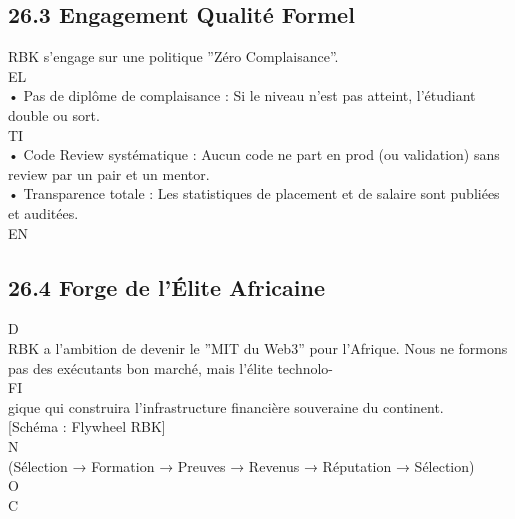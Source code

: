 \documentclass[12pt,landscape,a4paper]{article}
\begin{document}
\subsection{26.3 Engagement Qualité Formel}
RBK s’engage sur une politique ”Zéro Complaisance”.\\
\vspace{0.5em}
\vspace{0.5em}
\vspace{0.5em}
\vspace{0.5em}
EL\\
• Pas de diplôme de complaisance : Si le niveau n’est pas atteint, l’étudiant double ou sort.\\
\vspace{0.5em}
\vspace{0.5em}
\vspace{0.5em}
\vspace{0.5em}
TI\\
• Code Review systématique : Aucun code ne part en prod (ou validation) sans review par un pair et un mentor.\\
\vspace{0.5em}
• Transparence totale : Les statistiques de placement et de salaire sont publiées et auditées.\\
\vspace{0.5em}
\vspace{0.5em}
\vspace{0.5em}
\vspace{0.5em}
EN\\
\subsection{26.4 Forge de l’Élite Africaine}
\vspace{0.5em}
\vspace{0.5em}
\vspace{0.5em}
\vspace{0.5em}
D\\
RBK a l’ambition de devenir le ”MIT du Web3” pour l’Afrique. Nous ne formons pas des exécutants bon marché, mais l’élite technolo-\\
\vspace{0.5em}
\vspace{0.5em}
FI\\
gique qui construira l’infrastructure financière souveraine du continent.\\
\vspace{0.5em}
[Schéma : Flywheel RBK]\\
N\\
(Sélection → Formation → Preuves → Revenus → Réputation → Sélection)\\
O\\
C\\
\vspace{0.5em}
\vspace{0.5em}
\end{document}
